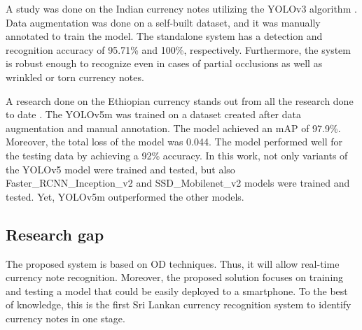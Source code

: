 A study was done on the Indian currency notes utilizing the YOLOv3 algorithm \cite{b12}. Data augmentation was done on a self-built dataset, and it was manually annotated to train the model. The standalone system has a detection and recognition accuracy of 95.71\% and 100\%, respectively. Furthermore, the system is robust enough to recognize even in cases of partial occlusions as well as wrinkled or torn currency notes.

A research done on the Ethiopian currency stands out from all the research done to date \cite{b13}. The YOLOv5m was trained on a dataset created after data augmentation and manual annotation. The model achieved an mAP of 97.9\%. Moreover, the total loss of the model was 0.044. The model performed well for the testing data by achieving a 92\% accuracy. In this work, not only variants of the YOLOv5 model were trained and tested, but also Faster\_RCNN\_Inception\_v2 and SSD\_Mobilenet\_v2 models were trained and tested. Yet, YOLOv5m outperformed the other models.

\subsection{Research gap}
The proposed system is based on OD techniques. Thus, it will allow real-time currency note recognition. Moreover, the proposed solution focuses on training and testing a model that could be easily deployed to a smartphone. To the best of knowledge, this is the first Sri Lankan currency recognition system to identify currency notes in one stage.

\vspace{0.15cm}